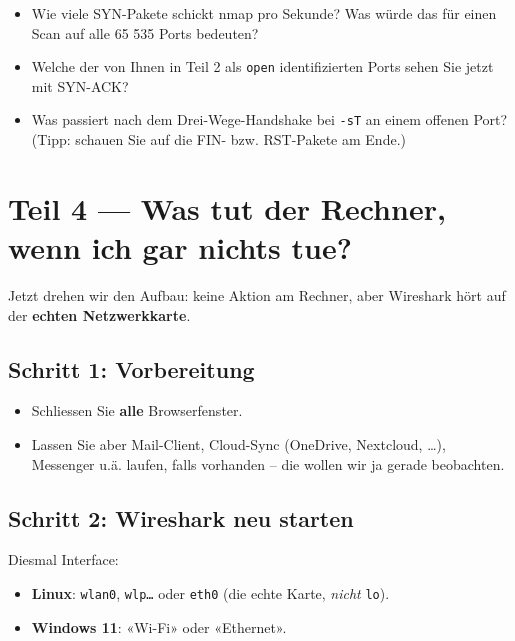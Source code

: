\documentclass[
  nswissgerman,
  a4paper,
  DIV=11,
  numbers=noendperiod,
  ngerman]{scrreprt}
\providecommand{\tightlist}{%
  \setlength{\itemsep}{0pt}\setlength{\parskip}{0pt}}
\begin{document}
\begin{itemize}
\tightlist
\item
  Wie viele SYN-Pakete schickt nmap pro Sekunde? Was würde das für einen
  Scan auf alle 65 535 Ports bedeuten?
\item
  Welche der von Ihnen in Teil 2 als \texttt{open} identifizierten Ports
  sehen Sie jetzt mit SYN-ACK?
\item
  Was passiert nach dem Drei-Wege-Handshake bei \texttt{-sT} an einem
  offenen Port? (Tipp: schauen Sie auf die FIN- bzw. RST-Pakete am
  Ende.)
\end{itemize}

\section{Teil 4 --- Was tut der Rechner, wenn ich gar nichts
tue?}\label{teil-4-was-tut-der-rechner-wenn-ich-gar-nichts-tue}

Jetzt drehen wir den Aufbau: keine Aktion am Rechner, aber Wireshark
hört auf der \textbf{echten Netzwerkkarte}.

\subsection{Schritt 1: Vorbereitung}\label{schritt-1-vorbereitung}

\begin{itemize}
\tightlist
\item
  Schliessen Sie \textbf{alle} Browserfenster.
\item
  Lassen Sie aber Mail-Client, Cloud-Sync (OneDrive, Nextcloud, \ldots),
  Messenger u.ä. laufen, falls vorhanden -- die wollen wir ja gerade
  beobachten.
\end{itemize}

\subsection{Schritt 2: Wireshark neu
starten}\label{schritt-2-wireshark-neu-starten}

Diesmal Interface:

\begin{itemize}
\tightlist
\item
  \textbf{Linux}: \texttt{wlan0}, \texttt{wlp…} oder \texttt{eth0} (die
  echte Karte, \emph{nicht} \texttt{lo}).
\item
  \textbf{Windows 11}: «Wi-Fi» oder «Ethernet».
\end{itemize}
\end{document}
